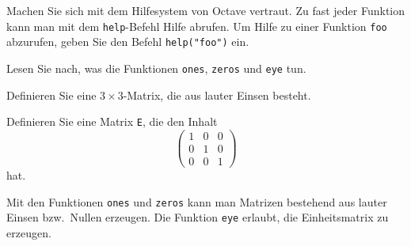 Machen Sie sich mit dem Hilfesystem von Octave vertraut. Zu fast
jeder Funktion kann man  mit dem {\tt help}-Befehl Hilfe abrufen.
Um Hilfe zu einer Funktion {\tt foo} abzurufen, geben Sie den Befehl
\verb+help("foo")+
ein.
\begin{teilaufgaben}
\item
Lesen Sie nach, was die Funktionen {\tt ones}, {\tt zeros} und {\tt eye}
tun.
\item
Definieren Sie eine $3\times 3$-Matrix, die aus lauter Einsen
besteht.
\item
Definieren Sie eine Matrix {\tt E}, die den Inhalt
\[
\begin{pmatrix}
1&0&0\\
0&1&0\\
0&0&1
\end{pmatrix}
\]
hat.
\end{teilaufgaben}

\begin{loesung}
\begin{teilaufgaben}
\item
Mit den Funktionen {\tt ones} und {\tt zeros} kann man Matrizen
bestehend aus lauter Einsen bzw.~Nullen erzeugen.
Die Funktion {\tt eye} erlaubt, die Einheitsmatrix zu erzeugen.
\item
{}
\item
{}
\end{teilaufgaben}
\end{loesung}


